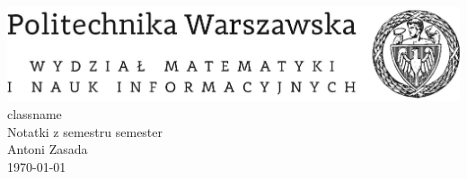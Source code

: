 \documentclass[a4paper,12pt]{article}
\begin{document}
\begin{titlepage}
    \begin{center}
        \includegraphics[scale=1]{logo_mini.png}
        \vspace{0.1\textheight}
        \\\Huge\textsf{{{classname}}\\
            \medskip
        \large Notatki z semestru {{semester}}\\}
        \vspace{0.35\textheight}
        \Large Antoni Zasada\\
        \medskip
        \normalsize \today
    \end{center}
\end{titlepage}
\end{document}
